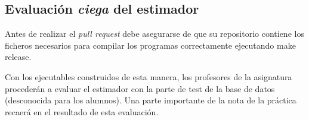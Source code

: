 \subsection*{Evaluación {\itshape ciega} del estimador }

Antes de realizar el {\itshape pull request} debe asegurarse de que su repositorio contiene los ficheros necesarios para compilar los programas correctamente ejecutando {\ttfamily make release}.

Con los ejecutables construidos de esta manera, los profesores de la asignatura procederán a evaluar el estimador con la parte de test de la base de datos (desconocida para los alumnos). Una parte importante de la nota de la práctica recaerá en el resultado de esta evaluación. 